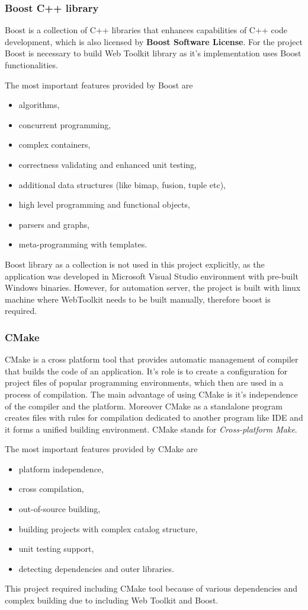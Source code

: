 \documentclass[a4paper,12pt]{book}
\newcommand\tab[1][1cm]{\hspace*{#1}}
\begin{document}
{{}

\subsubsection*{Boost C++ library}
{
\tab Boost is a collection of C++ libraries that enhances capabilities of C++ code development, which is also licensed by \textbf{Boost Software License}. For the project Boost is necessary to build Web Toolkit library as it's implementation uses Boost functionalities.

\bigskip
The most important features provided by Boost are
\begin{itemize}
	\item algorithms,
	\item concurrent programming,
	\item complex containers,
	\item correctness validating and enhanced unit testing,
	\item additional data structures (like bimap, fusion, tuple etc),
	\item high level programming and functional objects,
	\item parsers and graphs,
	\item meta-programming with templates.
\end{itemize}
	
Boost library as a collection is not used in this project explicitly, as the application was developed in Microsoft Visual Studio environment with pre-built Windows binaries. However, for automation server, the project is built with linux machine where WebToolkit needs to be built manually, therefore boost is required.
}
\subsubsection*{CMake}
{
\tab CMake is a cross platform tool that provides automatic management of compiler that builds the code of an application. It's role is to create a configuration for project files of popular programming environments, which then are used in a process of compilation. The main advantage of using CMake is it's independence of the compiler and the platform. Moreover CMake as a standalone program creates files with rules for compilation dedicated to another program like IDE and it forms a unified building environment. CMake stands for \textit{Cross-platform Make}.

\bigskip
The most important features provided by CMake are
\begin{itemize}
	\item platform independence,
	\item cross compilation,
	\item out-of-source building,
	\item building projects with complex catalog structure,
	\item unit testing support,
	\item detecting dependencies and outer libraries.
\end{itemize}
This project required including CMake tool because of various dependencies and complex building due to including Web Toolkit and Boost.  

}}
\end{document}
